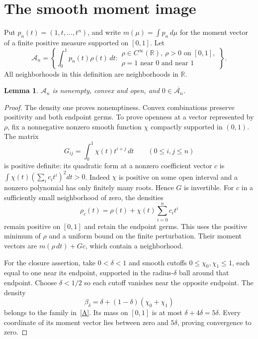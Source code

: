 \documentclass[11pt]{article}
\newtheorem{lemma}[theorem]{Lemma}
\newcommand{\R}{\mathbb R}
\newcommand{\A}{\mathcal A}
\begin{document}
\section{The smooth moment image}
Put $p_n(t)=(1,t,\ldots,t^n)$, and write
$m(\mu)=\int p_n\,d\mu$ for the moment vector of a finite positive measure
supported on $[0,1]$. Let
\begin{equation}\label{A}
 \A_n=\left\{\int_0^1p_n(t)\rho(t)\,dt:
 \begin{array}{l}
 \rho\in C^\infty(\R),\ \rho>0\text{ on }[0,1],\\[-2pt]
 \rho=1\text{ near }0\text{ and near }1
 \end{array}\right\}.
\end{equation}
All neighborhoods in this definition are neighborhoods in $\R$.

\begin{lemma}\label{open}
$\A_n$ is nonempty, convex and open, and $0\in\overline{\A_n}$.
\end{lemma}
\begin{proof}
The density one proves nonemptiness. Convex combinations preserve positivity
and both endpoint germs. To prove openness at a vector represented by $\rho$,
fix a nonnegative nonzero smooth function $\chi$ compactly supported in
$(0,1)$. The matrix
\[
 G_{ij}=\int_0^1\chi(t)t^{i+j}\,dt\qquad(0\le i,j\le n)
\]
is positive definite: its quadratic form at a nonzero coefficient vector
$c$ is $\int\chi(t)(\sum_i c_it^i)^2dt>0$. Indeed $\chi$ is positive on
some open interval and a nonzero polynomial has only finitely many roots.
Hence $G$ is invertible. For $c$ in a sufficiently small neighborhood of
zero, the densities
\[
 \rho_c(t)=\rho(t)+\chi(t)\sum_{i=0}^n c_it^i
\]
remain positive on $[0,1]$ and retain the endpoint germs. This uses the
positive minimum of $\rho$ and a uniform bound on the finite perturbation.
Their moment vectors are $m(\rho\,dt)+Gc$, which contain a neighborhood.

For the closure assertion, take $0<\delta<1$ and smooth cutoffs
$0\le\chi_0,\chi_1\le1$, each equal to one near its endpoint, supported
in the radius-$\delta$ ball around that endpoint. Choose $\delta<1/2$
so each cutoff vanishes near the opposite endpoint. The density
\[
 \beta_\delta=\delta+(1-\delta)(\chi_0+\chi_1)
\]
belongs to the family in~\eqref{A}. Its mass on $[0,1]$ is at most
$\delta+4\delta=5\delta$. Every coordinate of its moment vector lies
between zero and $5\delta$, proving convergence to zero.
\end{proof}
\end{document}
